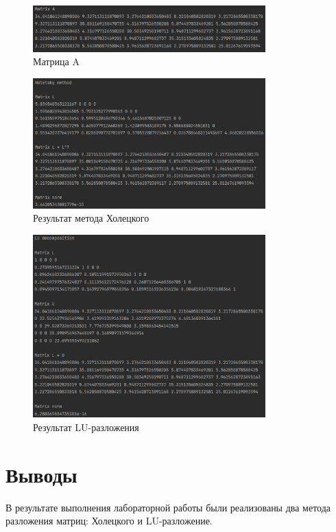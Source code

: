 \documentclass[a4paper, 14pt]{extarticle}
\begin{document}
\begin{figure}[!htb]
	\centering
	\includegraphics[width=0.8\textwidth]{img1}
\caption{Матрица A}
\label{fig:img1}
\end{figure}

\begin{figure}[!htb]
	\centering
	\includegraphics[width=0.8\textwidth]{img2}
\caption{Результат метода Холецкого}
\label{fig:img2}
\end{figure}

\begin{figure}[!htb]
	\centering
	\includegraphics[width=0.8\textwidth]{img3}
\caption{Результат LU-разложения}
\label{fig:img3}
\end{figure}

\section{Выводы}\label{Sect::conclusion}

В результате выполнения лабораторной работы были реализованы два метода разложения матриц: Холецкого и LU-разложение.
\end{document}
